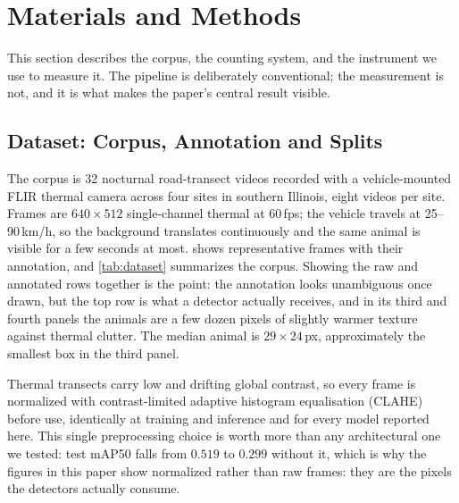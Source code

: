 \section{Materials and Methods}
\label{sec:methods}

This section describes the corpus, the counting system, and the instrument we use to
measure it. The pipeline is deliberately conventional; the measurement is not, and it is
what makes the paper's central result visible.

\subsection{Dataset: Corpus, Annotation and Splits}
\label{sec:dataset}

The corpus is 32 nocturnal road-transect videos recorded with a vehicle-mounted FLIR
thermal camera across four sites in southern Illinois, eight videos per site. Frames are
$640\times512$ single-channel thermal at 60\,fps; the vehicle travels at 25--90\,km/h, so
the background translates continuously and the same animal is visible for a few seconds at
most.  shows representative frames with their annotation, and
\cref{tab:dataset} summarizes the corpus. Showing the raw and annotated rows together is the
point: the annotation looks unambiguous once drawn, but the top row is what a detector
actually receives, and in its third and fourth panels the animals are a few dozen pixels of
slightly warmer texture against thermal clutter. The median animal is $29\times24$\,px,
approximately the smallest box in the third panel.

Thermal transects carry low and drifting global contrast, so every frame is normalized with contrast-limited adaptive histogram equalisation (CLAHE)~\cite{reza2004realization} before use, identically at training and inference and for
every model reported here. This single preprocessing choice is worth more than any architectural one we tested: test mAP50 falls from $0.519$ to $0.299$ without it, which
is why the figures in this paper show normalized rather than raw frames: they are the pixels
the detectors actually consume.

